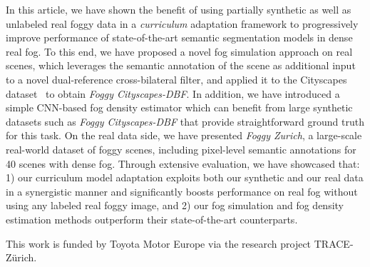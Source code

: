\documentclass[twocolumn]{svjour3}          \smartqed  \usepackage{graphicx}
\begin{document}
In this article, we have shown the benefit of using partially synthetic as well as unlabeled real foggy data in a \emph{curriculum} adaptation framework to progressively improve performance of state-of-the-art semantic segmentation models in dense real fog. To this end, we have proposed a novel fog simulation approach on real scenes, which leverages the semantic annotation of the scene as additional input to a novel dual-reference cross-bilateral filter, and applied it to the Cityscapes dataset~\cite{Cityscapes} to obtain \emph{Foggy Cityscapes-DBF}. In addition, we have introduced a simple CNN-based fog density estimator which can benefit from large synthetic datasets such as \emph{Foggy Cityscapes-DBF} that provide straightforward ground truth for this task. On the real data side, we have presented \emph{Foggy Zurich}, a large-scale real-world dataset of foggy scenes, including pixel-level semantic annotations for 40 scenes with dense fog. Through extensive evaluation, we have showcased that: 1) our curriculum model adaptation exploits both our synthetic and our real data in a synergistic manner and significantly boosts performance on real fog without using any labeled real foggy image, and 2) our fog simulation and fog density estimation methods outperform their state-of-the-art counterparts.

\begin{acknowledgements}
This work is funded by Toyota Motor Europe via the research project TRACE-Z\"urich.
\end{acknowledgements}



\end{document}
